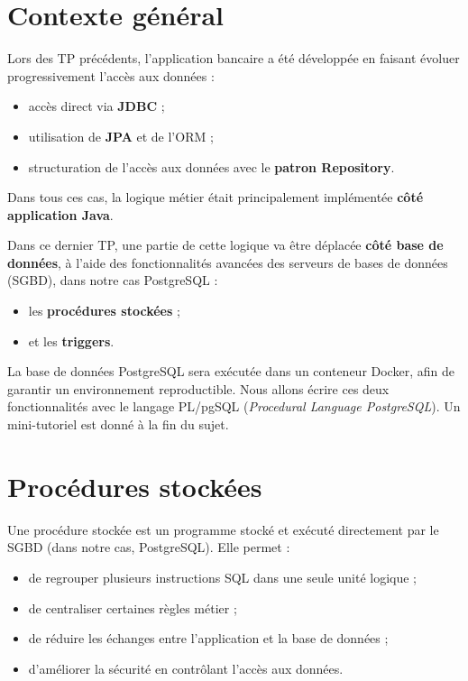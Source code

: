 \documentclass[11pt]{article}
\begin{document}
\section*{Contexte général}

Lors des TP précédents, l’application bancaire a été développée en faisant évoluer
progressivement l’accès aux données :
\begin{itemize}
    \item accès direct via \textbf{JDBC} ;
    \item utilisation de \textbf{JPA} et de l’ORM ;
    \item structuration de l’accès aux données avec le \textbf{patron Repository}.
\end{itemize}

Dans tous ces cas, la logique métier était principalement implémentée
\textbf{côté application Java}.

Dans ce dernier TP, une partie de cette logique va être déplacée
\textbf{côté base de données}, à l’aide des fonctionnalités avancées des serveurs de bases de données (SGBD), dans notre cas PostgreSQL :
\begin{itemize}
    \item les \textbf{procédures stockées} ;
    \item et les \textbf{triggers}.
\end{itemize}

La base de données PostgreSQL sera exécutée dans un conteneur Docker, afin de garantir un environnement reproductible. Nous allons écrire ces deux fonctionnalités avec le langage PL/pgSQL (\textit{Procedural Language PostgreSQL}). Un mini-tutoriel est donné à la fin du sujet.

\bigskip

\section*{Procédures stockées}

Une procédure stockée est un programme stocké et exécuté directement par le SGBD (dans notre cas, PostgreSQL).
Elle permet :
\begin{itemize}
    \item de regrouper plusieurs instructions SQL dans une seule unité logique ;
    \item de centraliser certaines règles métier ;
    \item de réduire les échanges entre l’application et la base de données ;
    \item d’améliorer la sécurité en contrôlant l’accès aux données.
\end{itemize}
\end{document}
